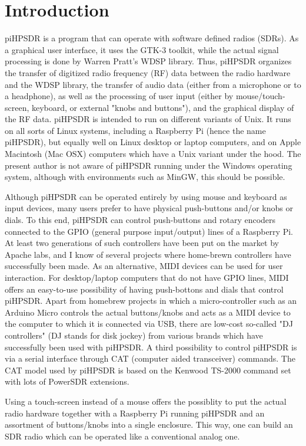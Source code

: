\documentclass[12pt]{book}
\begin{document}
\chapter{Introduction}
piHPSDR is a program that can operate with software defined radios (SDRs). As a graphical user interface,
it uses the GTK-3 toolkit, while the actual signal processing is done by Warren Pratt's WDSP library. Thus,
piHPSDR organizes the transfer of digitized radio frequency (RF) data between the radio hardware and the
WDSP library, the
transfer of audio data (either from a microphone or to a headphone), as well as the processing of user
input (either by mouse/touch-screen, keyboard, or external "knobs and buttons"),
 and the graphical display of the RF data. piHPSDR is intended
to run on different variants of Unix. It runs on all sorts of Linux systems, including a Raspberry Pi (hence
the name piHPSDR), but equally well on Linux desktop or laptop computers, and on Apple Macintosh (Mac OSX)
computers which have a Unix variant under the hood. The present author is not aware of piHPSDR running
under the Windows operating system, although with environments such as MinGW, this should be possible.

Although piHPSDR can be operated entirely by using mouse and keyboard as input devices, many users prefer to
have physical push-buttons and/or knobs or dials. To this end, piHPSDR can control push-buttons and rotary
encoders connected to the GPIO (general purpose input/output)
lines of a Raspberry Pi. At least two generations of such controllers have
been put on the market by Apache labs, and I know of several projects where home-brewn controllers have
successfully been made. As an alternative, MIDI devices can be used for user interaction. For desktop/laptop
computers that do not have GPIO lines, MIDI offers an easy-to-use possibility of having push-bottons and
dials that control piHPSDR. Apart from homebrew projects in which a micro-controller such as an Arduino
Micro controls the actual buttons/knobs and acts as a MIDI device to the computer to which it is connected
via USB, there are low-cost so-called "DJ controllers" (DJ stands for disk jockey) from various brands which
have successfully been used with piHPSDR. A third possibility to control piHPSDR is via a serial interface
through CAT (computer aided transceiver) commands. The CAT model used by piHPSDR is based on the Kenwood
TS-2000 command set with lots of PowerSDR extensions.

Using a touch-screen instead of a mouse offers the possiblity to put the actual radio hardware together
with a Raspberry Pi running piHPSDR and an assortment of buttons/knobs into a single enclosure. This way,
one can build an SDR radio which can be operated like a conventional analog one.
\end{document}
